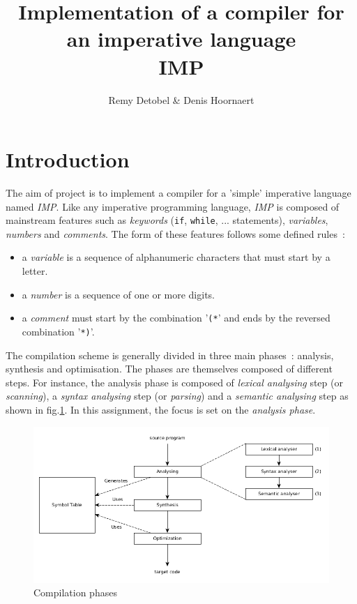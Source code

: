 \documentclass[a4paper,11pt]{article}
\title{Implementation of a compiler for an imperative language\\IMP}
\author{Remy Detobel \& Denis Hoornaert}
\begin{document}
\maketitle
\tableofcontents

\newpage

\section{Introduction}

  The aim of project is to implement a compiler for a 'simple' imperative language named \textit{IMP}. Like any imperative programming language, \textit{IMP} is composed of mainstream features such as \textit{keywords} (\verb|if|, \verb|while|, ... statements), \textit{variables}, \textit{numbers} and \textit{comments}.
  The form of these features follows some defined rules~:
  \begin{itemize}
    \item a \textit{variable} is a sequence of alphanumeric characters that must start by a letter.
    \item a \textit{number} is a sequence of one or more digits.
    \item a \textit{comment} must start by the combination '\verb|(*|' and ends by the reversed combination '\verb|*)|'. 
  \end{itemize}
  The compilation scheme is generally divided in three main phases~: analysis, synthesis and optimisation. The phases are themselves composed of different steps. For instance, the analysis phase is composed of \textit{lexical analysing} step (or \textit{scanning}), a \textit{syntax analysing} step (or \textit{parsing}) and a \textit{semantic analysing} step as shown in fig.\ref{compilation_phases}. In this assignment, the focus is set on the \textit{analysis phase}.
  \begin{figure}[h]
    \includegraphics[scale=0.45]{./img/phase_of_compiler.jpg}
    \centering
    \caption{Compilation phases}
    \label{compilation_phases}
  \end{figure}
  
\end{document}

